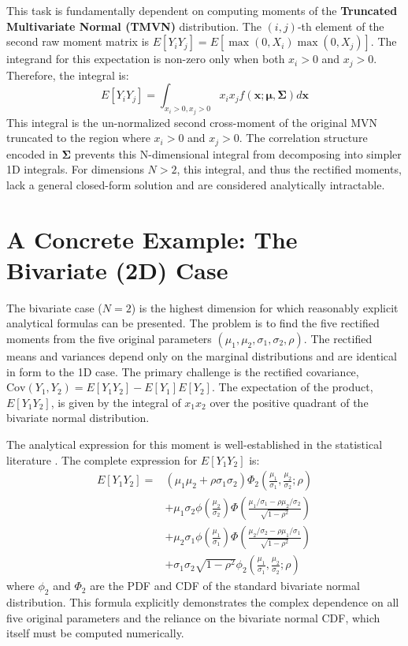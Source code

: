 This task is fundamentally dependent on computing moments of the \textbf{Truncated Multivariate Normal (TMVN)} distribution. The $(i, j)$-th element of the second raw moment matrix is $E[Y_i Y_j] = E[\max(0, X_i)\max(0, X_j)]$. The integrand for this expectation is non-zero only when both $x_i > 0$ and $x_j > 0$. Therefore, the integral is:
\begin{equation}
E[Y_i Y_j] = \int_{x_i > 0, x_j > 0} x_i x_j f(\mathbf{x}; \boldsymbol{\mu}, \boldsymbol{\Sigma}) d\mathbf{x}
\end{equation}
This integral is the un-normalized second cross-moment of the original MVN truncated to the region where $x_i > 0$ and $x_j > 0$. The correlation structure encoded in $\boldsymbol{\Sigma}$ prevents this N-dimensional integral from decomposing into simpler 1D integrals. For dimensions $N > 2$, this integral, and thus the rectified moments, lack a general closed-form solution and are considered analytically intractable.

\section{A Concrete Example: The Bivariate (2D) Case}
\label{sec:bivariate_case}

The bivariate case ($N=2$) is the highest dimension for which reasonably explicit analytical formulas can be presented. The problem is to find the five rectified moments from the five original parameters $(\mu_1, \mu_2, \sigma_1, \sigma_2, \rho)$. The rectified means and variances depend only on the marginal distributions and are identical in form to the 1D case. The primary challenge is the rectified covariance, $\text{Cov}(Y_1, Y_2) = E[Y_1 Y_2] - E[Y_1]E[Y_2]$. The expectation of the product, $E[Y_1 Y_2]$, is given by the integral of $x_1 x_2$ over the positive quadrant of the bivariate normal distribution.

The analytical expression for this moment is well-established in the statistical literature \cite{Muthen1990CensoredMoments}. The complete expression for $E[Y_1 Y_2]$ is:
\begin{align}
E[Y_1 Y_2] = & (\mu_1 \mu_2 + \rho \sigma_1 \sigma_2) \Phi_2\left(\frac{\mu_1}{\sigma_1}, \frac{\mu_2}{\sigma_2}; \rho\right) \nonumber \\
& + \mu_1 \sigma_2 \phi\left(\frac{\mu_2}{\sigma_2}\right)\Phi\left(\frac{\mu_1/\sigma_1 - \rho \mu_2/\sigma_2}{\sqrt{1-\rho^2}}\right) \nonumber \\
& + \mu_2 \sigma_1 \phi\left(\frac{\mu_1}{\sigma_1}\right)\Phi\left(\frac{\mu_2/\sigma_2 - \rho \mu_1/\sigma_1}{\sqrt{1-\rho^2}}\right) \nonumber \\
& + \sigma_1 \sigma_2 \sqrt{1-\rho^2} \phi_2\left(\frac{\mu_1}{\sigma_1}, \frac{\mu_2}{\sigma_2}; \rho\right)
\end{align}
where $\phi_2$ and $\Phi_2$ are the PDF and CDF of the standard bivariate normal distribution. This formula explicitly demonstrates the complex dependence on all five original parameters and the reliance on the bivariate normal CDF, which itself must be computed numerically.

